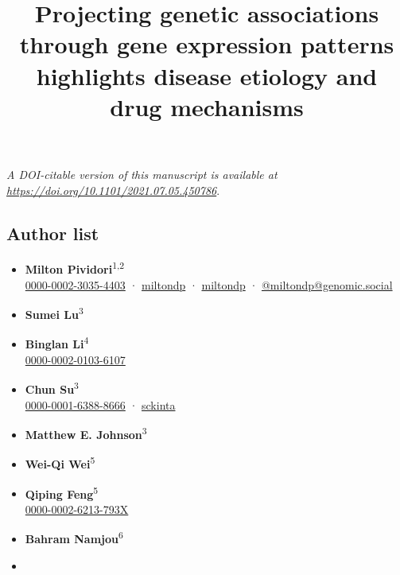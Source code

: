 \documentclass[
  a4paper,
]{article}
\title{Projecting genetic associations through gene expression patterns highlights disease etiology and drug mechanisms}
\author{}
\date{}
\begin{document}
\maketitle

\emph{A DOI-citable version of this manuscript is available at \url{https://doi.org/10.1101/2021.07.05.450786}}.

\hypertarget{authors}{%
\subsection{Author list}\label{authors}}

\begin{itemize}
\item
  \textbf{Milton Pividori}\textsuperscript{1,2} \\
  
  \href{https://orcid.org/0000-0002-3035-4403}{0000-0002-3035-4403}
  · 
  \href{https://github.com/miltondp}{miltondp}
  · 
  \href{https://twitter.com/miltondp}{miltondp}
  · 
  \href{https://genomic.social/@miltondp}{@miltondp@genomic.social}
\item
  \textbf{Sumei Lu}\textsuperscript{3}
\item
  \textbf{Binglan Li}\textsuperscript{4} \\
  
  \href{https://orcid.org/0000-0002-0103-6107}{0000-0002-0103-6107}
\item
  \textbf{Chun Su}\textsuperscript{3} \\
  
  \href{https://orcid.org/0000-0001-6388-8666}{0000-0001-6388-8666}
  · 
  \href{https://github.com/sckinta}{sckinta}
\item
  \textbf{Matthew E. Johnson}\textsuperscript{3}
\item
  \textbf{Wei-Qi Wei}\textsuperscript{5}
\item
  \textbf{Qiping Feng}\textsuperscript{5} \\
  
  \href{https://orcid.org/0000-0002-6213-793X}{0000-0002-6213-793X}
\item
  \textbf{Bahram Namjou}\textsuperscript{6}
\item

\end{itemize}
\end{document}
